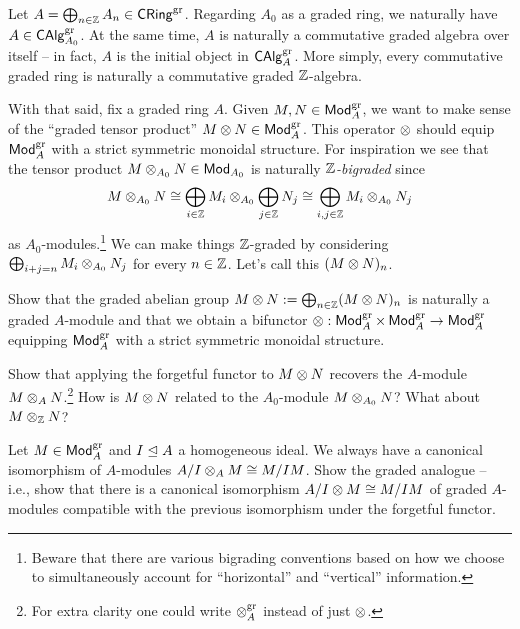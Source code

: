 \documentclass[11pt]{article}
\begin{document}
\begin{example}
Let $A=\bigoplus_{n\in\mathbb{Z}}A_n\in\operatorname{\mathsf{CRing}}^{\operatorname{gr}}$. Regarding $A_0$ as a graded ring, we naturally have $A\in\operatorname{\mathsf{CAlg}}_{A_0}^{\operatorname{gr}}$. At the same time, $A$ is naturally a commutative graded algebra over itself -- in fact, $A$ is the initial object in $\operatorname{\mathsf{CAlg}}_A^{\operatorname{gr}}$. More simply, every commutative graded ring is naturally a commutative graded $\mathbb{Z}$-algebra.
\end{example}

With that said, fix a graded ring $A$. Given $M,N\in\operatorname{\mathsf{Mod}}_A^{\operatorname{gr}}$, we want to make sense of the ``graded tensor product'' $M\otimes N\in\operatorname{\mathsf{Mod}}_A^{\operatorname{gr}}$. This operator $\otimes$ should equip $\operatorname{\mathsf{Mod}}_A^{\operatorname{gr}}$ with a strict symmetric monoidal structure. For inspiration we see that the tensor product $M\otimes_{A_0}N\in\operatorname{\mathsf{Mod}}_{A_0}$ is naturally \emph{$\mathbb{Z}$-bigraded} since 
\begin{align*}
M\otimes_{A_0}N
\cong\bigoplus_{i\in\mathbb{Z}}M_i\otimes_{A_0}\bigoplus_{j\in\mathbb{Z}}N_j
\cong\bigoplus_{i,j\in\mathbb{Z}}M_i\otimes_{A_0}N_j
\end{align*}
as $A_0$-modules.\footnote{Beware that there are various bigrading conventions based on how we choose to simultaneously account for ``horizontal'' and ``vertical'' information.} We can make things $\mathbb{Z}$-graded by considering $\bigoplus_{i+j=n}M_i\otimes_{A_0}N_j$ for every $n\in\mathbb{Z}$. Let's call this $(M\otimes N)_n$. 

\begin{exercise}
Show that the graded abelian group $M\otimes N:=\bigoplus_{n\in\mathbb{Z}}(M\otimes N)_n$ is naturally a graded $A$-module and that we obtain a bifunctor $\otimes: \operatorname{\mathsf{Mod}}_A^{\operatorname{gr}}\times\operatorname{\mathsf{Mod}}_A^{\operatorname{gr}}\to\operatorname{\mathsf{Mod}}_A^{\operatorname{gr}}$ equipping $\operatorname{\mathsf{Mod}}_A^{\operatorname{gr}}$ with a strict symmetric monoidal structure.
\end{exercise}

\begin{exercise}
Show that applying the forgetful functor to $M\otimes N$ recovers the $A$-module $M\otimes_AN$.\footnote{For extra clarity one could write $\otimes_A^{\operatorname{gr}}$ instead of just $\otimes$.} How is $M\otimes N$ related to the $A_0$-module $M\otimes_{A_0}N$? What about $M\otimes_{\mathbb{Z}}N$?
\end{exercise}

\begin{exercise}
Let $M\in\operatorname{\mathsf{Mod}}_A^{\operatorname{gr}}$ and $I\trianglelefteq A$ a homogeneous ideal. We always have a canonical isomorphism of $A$-modules $A/I\otimes_AM\cong M/IM$. Show the graded analogue -- i.e., show that there is a canonical isomorphism $A/I\otimes M\cong M/IM$ of graded $A$-modules compatible with the previous isomorphism under the forgetful functor.
\end{exercise}
\end{document}
